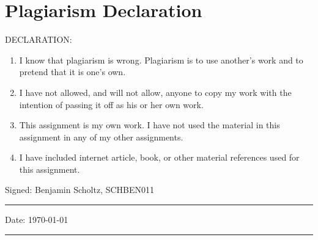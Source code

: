 
\newpage
\section{Plagiarism Declaration}
DECLARATION:
\begin{enumerate}
\item I know that plagiarism is wrong. Plagiarism is to use another’s work and to pretend that it is one’s own.
\item I have not allowed, and will not allow, anyone to copy my work with the intention of passing it off as his or her own work.
\item This assignment is my own work. I have not used the material in this assignment in any of my other assignments.
\item I have included internet article, book, or other material references used for this assignment.
\end{enumerate}

Signed: Benjamin Scholtz, SCHBEN011\\
\hrule
Date: \today \\
\hrule